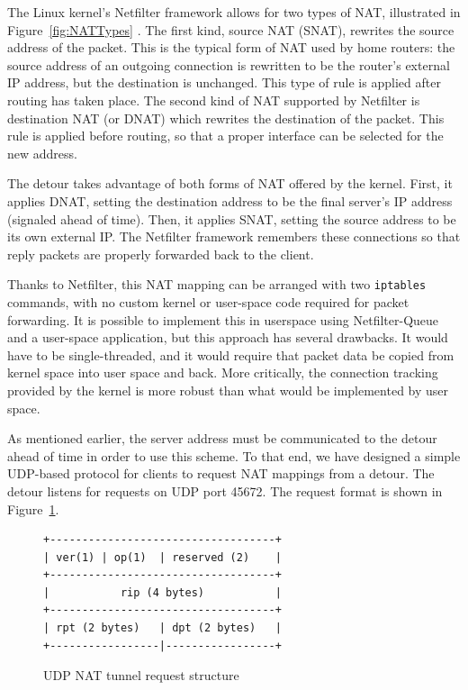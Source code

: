\documentclass{cwru}
\begin{document}
The Linux kernel's Netfilter framework allows for two types of NAT, illustrated
in Figure~\ref{fig:NATTypes} \cite{russell2002nat}. The first kind, source NAT
(SNAT), rewrites the source address of the packet. This is the typical form of
NAT used by home routers: the source address of an outgoing connection is
rewritten to be the router's external IP address, but the destination is
unchanged. This type of rule is applied after routing has taken place. The
second kind of NAT supported by Netfilter is destination NAT (or DNAT) which
rewrites the destination of the packet. This rule is applied before routing, so
that a proper interface can be selected for the new address.

The detour takes advantage of both forms of NAT offered by the kernel. First, it
applies DNAT, setting the destination address to be the final server's IP
address (signaled ahead of time). Then, it applies SNAT, setting the source
address to be its own external IP. The Netfilter framework remembers these
connections so that reply packets are properly forwarded back to the client.

Thanks to Netfilter, this NAT mapping can be arranged with two \texttt{iptables}
commands, with no custom kernel or user-space code required for packet
forwarding. It is possible to implement this in userspace using Netfilter-Queue
and a user-space application, but this approach has several drawbacks. It would
have to be single-threaded, and it would require that packet data be copied from
kernel space into user space and back. More critically, the connection tracking
provided by the kernel is more robust than what would be implemented by user
space.

As mentioned earlier, the server address must be communicated to the detour
ahead of time in order to use this scheme. To that end, we have designed a
simple UDP-based protocol for clients to request NAT mappings from a detour. The
detour listens for requests on UDP port 45672. The request format is shown
in Figure~\ref{fig:udp-nat-packet}.

\begin{figure}
  \centering
\begin{BVerbatim}
+-----------------------------------+
| ver(1) | op(1)  | reserved (2)    |
+-----------------------------------+
|           rip (4 bytes)           |
+-----------------------------------+
| rpt (2 bytes)   | dpt (2 bytes)   |
+-----------------|-----------------+
\end{BVerbatim}
  \caption{UDP NAT tunnel request structure}
  \label{fig:udp-nat-packet}
\end{figure}
\end{document}

